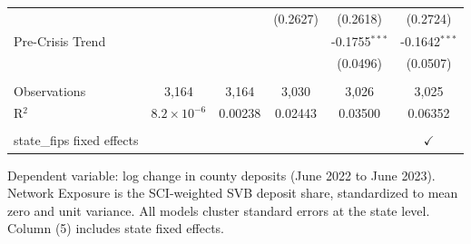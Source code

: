 \begin{table}[htbp]
\begin{tabular}{lccccc}
                                 &                      &          & (0.2627)        & (0.2618)        & (0.2724)\\   
      Pre-Crisis Trend           &                      &          &                 & -0.1755$^{***}$ & -0.1642$^{***}$\\   
                                 &                      &          &                 & (0.0496)        & (0.0507)\\   
       \\
      Observations               & 3,164                & 3,164    & 3,030           & 3,026           & 3,025\\  
      R$^2$                      & $8.2\times 10^{-6}$  & 0.00238  & 0.02443         & 0.03500         & 0.06352\\  
       \\
      state\_fips fixed effects  &                      &          &                 &                 & $\checkmark$\\   
      \bottomrule
   \end{tabular}
   
   \par \raggedright 
   Dependent variable: log change in county deposits (June 2022 to June 2023). Network Exposure is the SCI-weighted SVB deposit share, standardized to mean zero and unit variance. All models cluster standard errors at the state level. Column (5) includes state fixed effects.
\end{table}
